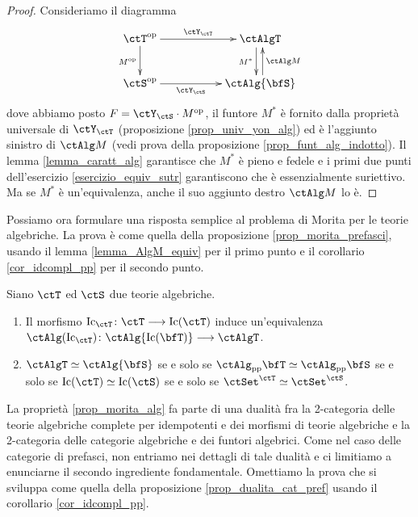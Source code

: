 \begin{proof}
 Consideriamo il diagramma
 \[ \xymatrix{ \ctT^{\op} \ar[rr]^-{\ctY_{\ctT}} \ar[d]_{M^{\op}} & & \ctAlgT \ar@<-0.8ex>[d]_{M^*} \\
  \ctS^{\op} \ar[rr]_-{\ctY_{\ctS}} & & \ctAlg{\bfS} \ar@<-0.5ex>[u]_{\ctAlg M} } \]
 dove abbiamo posto \(F = \ctY_{\ctS} \cmp M^{\op}\), il funtore \(M^*\) è fornito dalla proprietà universale di \(\ctY_{\ctT}\)
 (proposizione \ref{prop_univ_yon_alg}) ed è l'aggiunto sinistro di \(\ctAlg M\) (vedi prova della proposizione
 \ref{prop_funt_alg_indotto}). Il lemma \ref{lemma_caratt_alg} garantisce che \(M^*\) è pieno e fedele e i primi due punti
 dell'esercizio \ref{esercizio_equiv_sutr} garantiscono che è
 essenzialmente suriettivo. Ma se \(M^*\) è un'equivalenza, anche il suo aggiunto destro \(\ctAlg M\) lo è.
\end{proof}

Possiamo ora formulare una risposta semplice al problema di Morita per le teorie algebriche. La prova è come quella della
proposizione \ref{prop_morita_prefasci}, usando il lemma \ref{lemma_AlgM_equiv} per il primo punto e il corollario
\ref{cor_idcompl_pp} per il secondo punto.

\begin{proposition}\label{prop_morita_alg}
 Siano \(\ctT\) ed \(\ctS\) due teorie algebriche.
 \begin{enumerate}
  \item Il morfismo \(\mathrm{Ic}_{\ctT} \colon \ctT \fun \mathrm{Ic}(\ctT)\) induce un'equivalenza
        \(\ctAlg({\mathrm{Ic}_{\ctT}}) \colon \ctAlg{\mathrm{Ic}(\bfT)} \fun \ctAlgT\).
  \item  \(\ctAlgT \simeq \ctAlg{\bfS}\) se e solo se \(\ctAlg_{\mathrm{pp}}{\bfT} \simeq \ctAlg_{\mathrm{pp}}{\bfS}\)
        se e solo se \(\mathrm{Ic}(\ctT) \simeq \mathrm{Ic}(\ctS)\) se e solo se \(\ctSet^{\ctT} \simeq \ctSet^{\ctS}\).
 \end{enumerate}
\end{proposition}

La proprietà \ref{prop_morita_alg} fa parte di una dualità fra la 2-categoria delle teorie algebriche complete per
idempotenti e dei morfismi di teorie algebriche e la 2-categoria delle categorie algebriche e dei funtori algebrici.
Come nel caso delle categorie di prefasci, non entriamo nei dettagli di tale dualità e ci limitiamo a enunciarne il
secondo ingrediente fondamentale. Omettiamo la prova che si sviluppa come quella della proposizione
\ref{prop_dualita_cat_pref} usando il corollario \ref{cor_idcompl_pp}.


